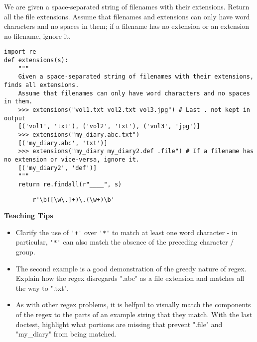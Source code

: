 \begin{blocksection}
\question We are given a space-separated string of filenames with their extensions. Return all the file extensions.
Assume that filenames and extensions can only have word characters and no spaces in them; if a filename has no extension or an extension no filename,
ignore it.

\begin{lstlisting}
import re
def extensions(s):
    """
    Given a space-separated string of filenames with their extensions, finds all extensions.
    Assume that filenames can only have word characters and no spaces in them.
    >>> extensions("vol1.txt vol2.txt vol3.jpg") # Last . not kept in output
    [('vol1', 'txt'), ('vol2', 'txt'), ('vol3', 'jpg')]
    >>> extensions("my_diary.abc.txt")
    [('my_diary.abc', 'txt')]
    >>> extensions("my_diary my_diary2.def .file") # If a filename has no extension or vice-versa, ignore it.
    [('my_diary2', 'def')]
    """
    return re.findall(r"____", s)
\end{lstlisting}

\begin{solution}[2in]
    \begin{lstlisting}
        r'\b([\w\.]+)\.(\w+)\b'
    \end{lstlisting}
\end{solution}
\end{blocksection}

\begin{guide}
\begin{blocksection}
\textbf{Teaching Tips}
    \begin{itemize}
        \item Clarify the use of \lstinline$'+'$ over \lstinline$'*'$ to match at least one word character - in particular, \lstinline$'*'$ can also match the absence of the preceding character / group.
        \item The second example is a good demonstration of the greedy nature of regex. Explain how the regex disregards ".abc" as a file extension and matches all the way to ".txt".
        \item As with other regex problems, it is helfpul to visually match the components of the regex to the parts of an example string that they match. With the last doctest, highlight what portions are missing that prevent ".file" and "my\_diary" from being matched.
    \end{itemize}
\end{blocksection}
\end{guide}